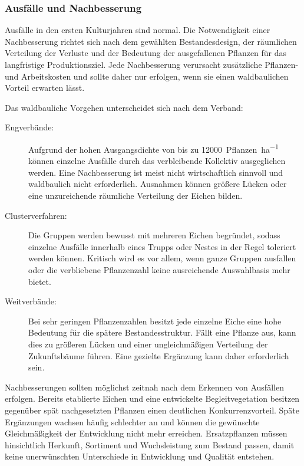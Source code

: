 \documentclass[twocolumn, bibliography=totoc, abstract=true]{scrartcl}
\begin{document}
\subsubsection{Ausfälle und Nachbesserung}

Ausfälle in den ersten Kulturjahren sind normal. Die Notwendigkeit einer Nachbesserung richtet sich nach dem gewählten Bestandesdesign, der räumlichen Verteilung der Verluste und der Bedeutung der ausgefallenen Pflanzen für das langfristige Produktionsziel. Jede Nachbesserung verursacht zusätzliche Pflanzen- und Arbeitskosten und sollte daher nur erfolgen, wenn sie einen waldbaulichen Vorteil erwarten lässt.

Das waldbauliche Vorgehen unterscheidet sich nach dem Verband:

\begin{description}
\item[Engverbände:] Aufgrund der hohen Ausgangsdichte von bis zu \qty{12000}{Pflanzen\per\hectare} können einzelne Ausfälle durch das verbleibende Kollektiv ausgeglichen werden. Eine Nachbesserung ist meist nicht wirtschaftlich sinnvoll und waldbaulich nicht erforderlich. Ausnahmen können größere Lücken oder eine unzureichende räumliche Verteilung der Eichen bilden.
\item[Clusterverfahren:] Die Gruppen werden bewusst mit mehreren Eichen begründet, sodass einzelne Ausfälle innerhalb eines Trupps oder Nestes in der Regel toleriert werden können. Kritisch wird es vor allem, wenn ganze Gruppen ausfallen oder die verbliebene Pflanzenzahl keine ausreichende Auswahlbasis mehr bietet.
\item[Weitverbände:] Bei sehr geringen Pflanzenzahlen besitzt jede einzelne Eiche eine hohe Bedeutung für die spätere Bestandesstruktur. Fällt eine Pflanze aus, kann dies zu größeren Lücken und einer ungleichmäßigen Verteilung der Zukunftsbäume führen. Eine gezielte Ergänzung kann daher erforderlich sein.
\end{description}

Nachbesserungen sollten möglichst zeitnah nach dem Erkennen von Ausfällen erfolgen. Bereits etablierte Eichen und eine entwickelte Begleitvegetation besitzen gegenüber spät nachgesetzten Pflanzen einen deutlichen Konkurrenzvorteil. Späte Ergänzungen wachsen häufig schlechter an und können die gewünschte Gleichmäßigkeit der Entwicklung nicht mehr erreichen. Ersatzpflanzen müssen hinsichtlich Herkunft, Sortiment und Wuchsleistung zum Bestand passen, damit keine unerwünschten Unterschiede in Entwicklung und Qualität entstehen.
\end{document}
